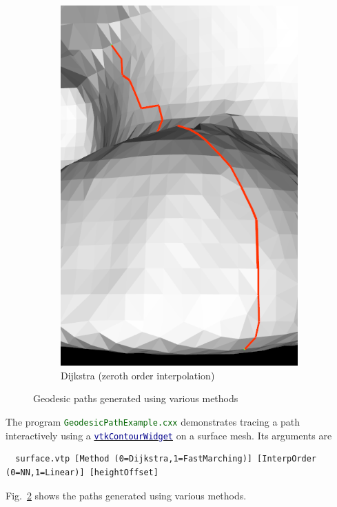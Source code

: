 \documentclass{InsightArticle}
\def\code#1{\small\textcolor{darkgreen}{\texttt{#1}}}
\def\vtk#1{\href{www.vtk.org/doc/nightly/html/class#1.html}{\small\textcolor{darkblue}{\texttt{#1}}}}
\begin{document}
\begin{figure}
\begin{subfigure}[b]{0.3\textwidth}
                \includegraphics[width=\textwidth]{GeodesicPathDijkstraZerothOrderInterp}
                \caption{Dijkstra (zeroth order interpolation)}
                \label{fig:GeodesicPathDijkstra}
        \end{subfigure}
        \caption{Geodesic paths generated using various methods}
        \label{fig:GeodesicPaths}
\end{figure}
The program \code{GeodesicPathExample.cxx} demonstrates tracing a path interactively using a \vtk{vtkContourWidget} on a surface mesh. Its arguments are
\begin{lstlisting}
  surface.vtp [Method (0=Dijkstra,1=FastMarching)] [InterpOrder (0=NN,1=Linear)] [heightOffset]
\end{lstlisting}
Fig.~\ref{fig:GeodesicPaths} shows the paths generated using various methods.
\end{document}
